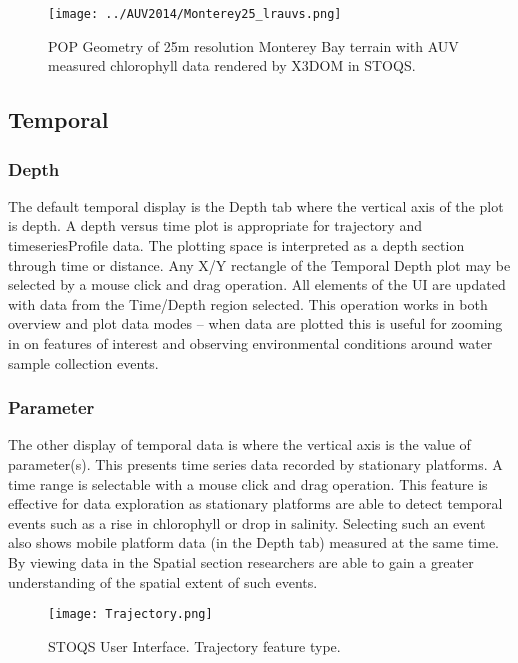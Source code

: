 \documentclass[conference]{IEEEtran}
\begin{document}
\begin{figure}[htbp]
\centering
\texttt{[image: ../AUV2014/Monterey25\_lrauvs.png]}
\caption{POP Geometry of 25m resolution Monterey Bay terrain with AUV measured chlorophyll data rendered by X3DOM in STOQS.}
\label{fig:Monterey25_lrauvs}
\end{figure}


\subsection{Temporal}

\subsubsection{Depth}
The default temporal display is the Depth tab where the vertical axis of the plot is depth. A depth versus time plot is appropriate for trajectory and timeseriesProfile data. The plotting space is interpreted as a depth section through time or distance. Any X/Y rectangle of the Temporal Depth plot may be selected by a mouse click and drag operation. All elements of the UI are updated with data from the Time/Depth region selected. This operation works in both overview and plot data modes -- when data are plotted this is useful for zooming in on features of interest and observing environmental conditions around water sample collection events.

\subsubsection{Parameter}
The other display of temporal data is where the vertical axis is the value of parameter(s). This presents time series data recorded by stationary platforms. A time range is selectable with a mouse click and drag operation. This feature is effective for data exploration as stationary platforms are able to detect temporal events such as a rise in chlorophyll or drop in salinity. Selecting such an event also shows mobile platform data (in the Depth tab) measured at the same time. By viewing data in the Spatial section researchers are able to gain a greater understanding of the spatial extent of such events.


\begin{figure*}[htbp]
\centering
\texttt{[image: Trajectory.png]}
\caption{STOQS User Interface. Trajectory feature type.}
\label{fig:Trajectory}
\end{figure*}
\end{document}
